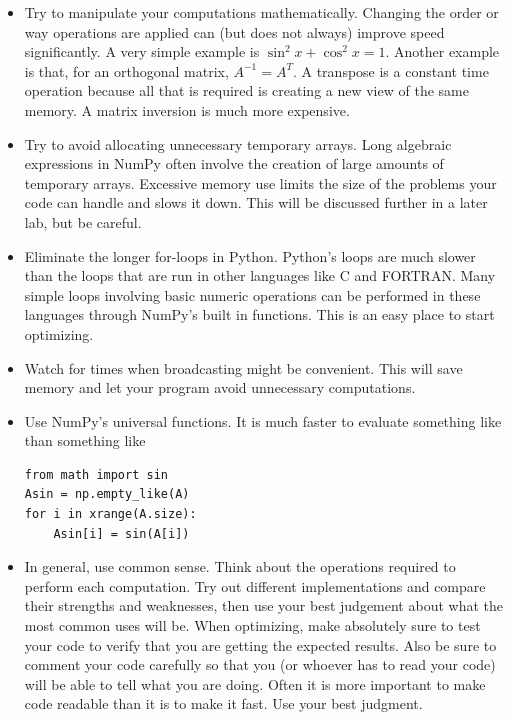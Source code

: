 \begin{itemize}

\item Try to manipulate your computations mathematically.
Changing the order or way operations are applied can (but does not always) improve speed significantly.
A very simple example is $\sin^2 x + \cos^2 x = 1$.
Another example is that, for an orthogonal matrix, $A^{-1} = A^T$.
A transpose is a constant time operation because all that is required is creating a new view of the same memory.
A matrix inversion is much more expensive.

\item Try to avoid allocating unnecessary temporary arrays.
Long algebraic expressions in NumPy often involve the creation of large amounts of temporary arrays.
Excessive memory use limits the size of the problems your code can handle and slows it down.
This will be discussed further in a later lab, but be careful.

\item Eliminate the longer for-loops in Python.
Python's loops are much slower than the loops that are run in other languages like C and FORTRAN.
Many simple loops involving basic numeric operations can be performed in these languages through NumPy's built in functions.
This is an easy place to start optimizing.

\item Watch for times when broadcasting might be convenient.
This will save memory and let your program avoid unnecessary computations.

\item Use NumPy's universal functions.
It is much faster to evaluate something like  than something like
\begin{lstlisting}
from math import sin
Asin = np.empty_like(A)
for i in xrange(A.size):
    Asin[i] = sin(A[i])
\end{lstlisting}

\item In general, use common sense.
Think about the operations required to perform each computation.
Try out different implementations and compare their strengths and weaknesses, then use your best judgement about what the most common uses will be.
When optimizing, make absolutely sure to test your code to verify that you are getting the expected results.
Also be sure to comment your code carefully so that you (or whoever has to read your code) will be able to tell what you are doing.
Often it is more important to make code readable than it is to make it fast.
Use your best judgment.

\end{itemize}

